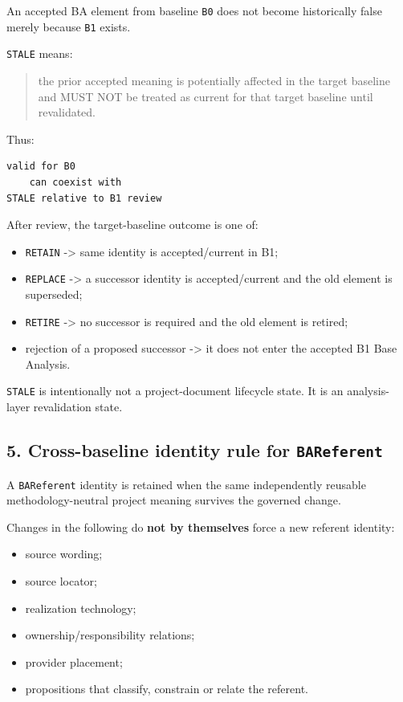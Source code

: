 \documentclass[11pt,a4paper]{article}
\providecommand{\tightlist}{\setlength{\itemsep}{0pt}\setlength{\parskip}{0pt}}\setlength{\emergencystretch}{4em}\hbadness=10000\hfuzz=20pt\sloppy
\begin{document}
An accepted BA element from baseline \texttt{B0} does not become
historically false merely because \texttt{B1} exists.

\texttt{STALE} means:

\begin{quote}
the prior accepted meaning is potentially affected in the target
baseline and MUST NOT be treated as current for that target baseline
until revalidated.
\end{quote}

Thus:

\begin{verbatim}
valid for B0
    can coexist with
STALE relative to B1 review
\end{verbatim}

After review, the target-baseline outcome is one of:

\begin{itemize}
\tightlist
\item
  \texttt{RETAIN} -\textgreater{} same identity is accepted/current in
  B1;
\item
  \texttt{REPLACE} -\textgreater{} a successor identity is
  accepted/current and the old element is superseded;
\item
  \texttt{RETIRE} -\textgreater{} no successor is required and the old
  element is retired;
\item
  rejection of a proposed successor -\textgreater{} it does not enter
  the accepted B1 Base Analysis.
\end{itemize}

\texttt{STALE} is intentionally not a project-document lifecycle state.
It is an analysis-layer revalidation state.

\subsection{\texorpdfstring{5. Cross-baseline identity rule for
\texttt{BAReferent}}{5. Cross-baseline identity rule for BAReferent}}\label{cross-baseline-identity-rule-for-bareferent}

A \texttt{BAReferent} identity is retained when the same independently
reusable methodology-neutral project meaning survives the governed
change.

Changes in the following do \textbf{not by themselves} force a new
referent identity:

\begin{itemize}
\tightlist
\item
  source wording;
\item
  source locator;
\item
  realization technology;
\item
  ownership/responsibility relations;
\item
  provider placement;
\item
  propositions that classify, constrain or relate the referent.
\end{itemize}
\end{document}
